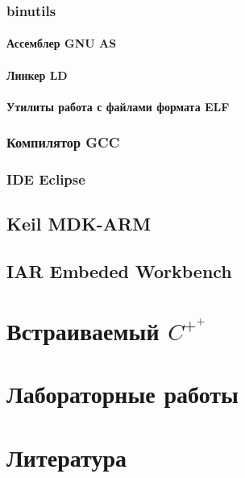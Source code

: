 \documentclass[oneside,12pt]{book}
\newcommand{\cpp}{$C^{+^{+}}$}
\begin{document}
\section{binutils}
\subsection{Ассемблер GNU AS}
\subsection{Линкер LD}
\subsection{Утилиты работа с файлами формата ELF}
\section{Компилятор GCC}
\section{IDE Eclipse}
\chapter{Keil MDK-ARM}
\chapter{IAR Embeded Workbench}

\part{Встраиваемый \cpp}

\part{Лабораторные работы}

\part{Литература}
\end{document}
